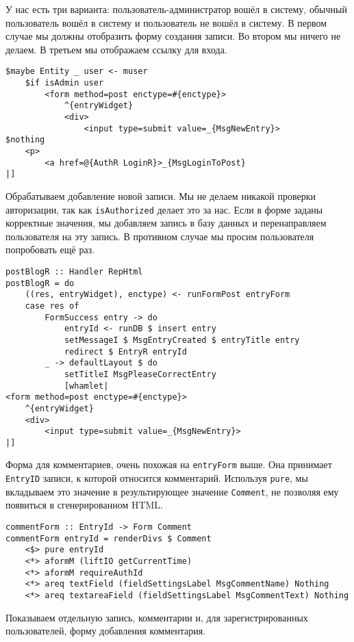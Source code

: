 У нас есть три варианта: пользователь-администратор вошёл в систему, обычный пользователь вошёл в систему и пользователь не вошёл в систему. В первом случае мы должны отобразить форму создания записи. Во втором мы ничего не делаем. В третьем мы отображаем ссылку для входа. 
 
\begin{lstlisting}
$maybe Entity _ user <- muser
    $if isAdmin user
        <form method=post enctype=#{enctype}>
            ^{entryWidget}
            <div>
                <input type=submit value=_{MsgNewEntry}>
$nothing
    <p>
        <a href=@{AuthR LoginR}>_{MsgLoginToPost}
|]
\end{lstlisting}%
 
Обрабатываем добавление новой записи. Мы не делаем никакой проверки авторизации, так как \lstinline!isAuthorized! делает это за нас. Если в форме заданы корректные значения, мы добавляем запись в базу данных и перенаправляем пользователя на эту запись. В противном случае мы просим пользователя попробовать ещё раз. 
 
\begin{lstlisting}
postBlogR :: Handler RepHtml
postBlogR = do
    ((res, entryWidget), enctype) <- runFormPost entryForm
    case res of
        FormSuccess entry -> do
            entryId <- runDB $ insert entry
            setMessageI $ MsgEntryCreated $ entryTitle entry
            redirect $ EntryR entryId
        _ -> defaultLayout $ do
            setTitleI MsgPleaseCorrectEntry
            [whamlet|
<form method=post enctype=#{enctype}>
    ^{entryWidget}
    <div>
        <input type=submit value=_{MsgNewEntry}>
|]
\end{lstlisting}%
 
Форма для комментариев, очень похожая на \lstinline!entryForm! выше. Она принимает \lstinline!EntryID! записи, к которой относится комментарий. Используя \lstinline!pure!, мы вкладываем это значение в результирующее значение \lstinline!Comment!, не позволяя ему появиться в сгенерированном HTML. 
 
\begin{lstlisting}
commentForm :: EntryId -> Form Comment
commentForm entryId = renderDivs $ Comment
    <$> pure entryId
    <*> aformM (liftIO getCurrentTime)
    <*> aformM requireAuthId
    <*> areq textField (fieldSettingsLabel MsgCommentName) Nothing
    <*> areq textareaField (fieldSettingsLabel MsgCommentText) Nothing
\end{lstlisting}
 
Показываем отдельную запись, комментарии и, для зарегистрированных пользователей, форму добавления комментария.
 
